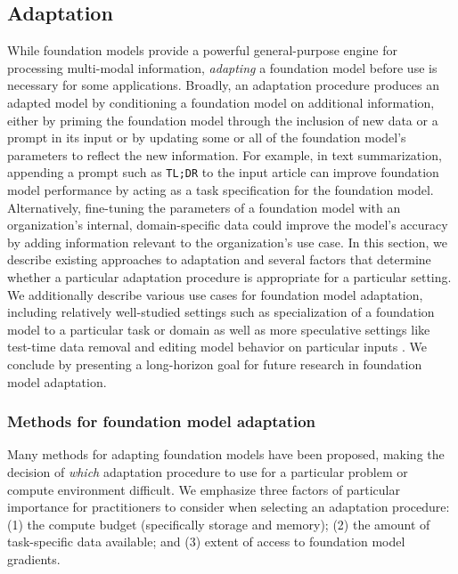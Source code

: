 \newsection
\subsection{Adaptation}
\label{sec:adaptation}

 While foundation models provide a powerful general-purpose engine for processing multi-modal information, \textit{adapting} a foundation model before use is necessary for some applications. Broadly, an adaptation procedure produces an adapted model by conditioning a foundation model on additional information, either by priming the foundation model through the inclusion of new data or a prompt in its input or by updating some or all of the foundation model's parameters to reflect the new information. For example, in text summarization, appending a prompt such as \texttt{TL;DR} to the input article can improve foundation model performance  \citep{radford2019language} by acting as a task specification for the foundation model. Alternatively, fine-tuning the parameters of a foundation model with an organization's internal, domain-specific data could improve the model's accuracy by adding information relevant to the organization’s use case. In this section, we describe existing approaches to adaptation and several factors that determine whether a particular adaptation procedure is appropriate for a particular setting. We additionally describe various use cases for foundation model adaptation, including relatively well-studied settings such as specialization of a foundation model to a particular task or domain as well as more speculative settings like test-time data removal \citep{bourtoule2019machine} and editing model behavior on particular inputs \citep{sinitsin2020editable}. We conclude by presenting a long-horizon goal for future research in foundation model adaptation.
\subsubsection{Methods for foundation model adaptation} Many methods for adapting foundation models have been proposed, making the decision of \textit{which} adaptation procedure to use for a particular problem or compute environment difficult. We emphasize three factors of particular importance for practitioners to consider when selecting an adaptation procedure: (1) the compute budget (specifically storage and memory); (2) the amount of task-specific data available; and (3) extent of access to foundation model gradients.
